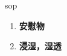 
\begin{frame}
{\huge sop}
\begin{center}
\begin{enumerate}\Large
  \item \textbf{安慰物}
  \item \textbf{浸湿，湿透}
\end{enumerate}
\end{center}
\end{frame}

